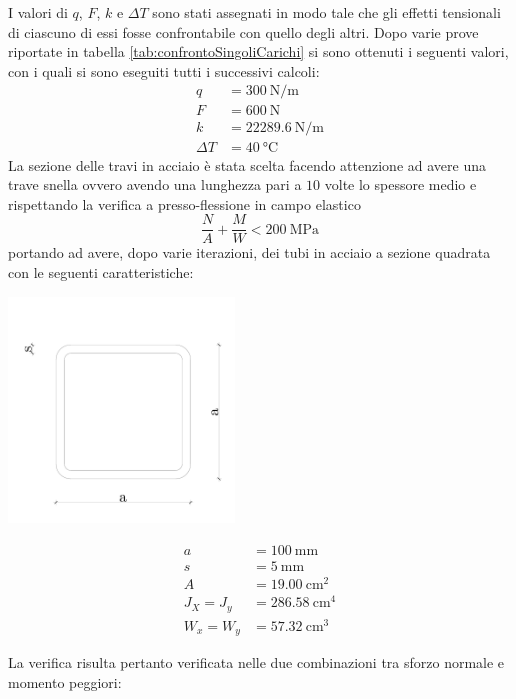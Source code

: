I valori di $q$, $F$, $k$ e $\Delta T$ sono stati assegnati in modo tale che gli effetti  tensionali di ciascuno di essi fosse confrontabile con quello degli altri. 
Dopo varie prove riportate in tabella \ref{tab:confrontoSingoliCarichi} si sono ottenuti i seguenti valori, con i quali si sono eseguiti tutti i successivi calcoli:
\begin{align*}
	q &= \SI{300}{\newton \per \metre}\\
	F &= \SI{600}{\newton}\\
	k &= \SI{22289.6}{\newton \per \metre}\\
	\Delta T &= \SI{40}{\celsius}
\end{align*}
La sezione delle travi in acciaio è stata scelta facendo attenzione ad avere una trave snella ovvero avendo una lunghezza pari a $10$ volte lo spessore medio e rispettando la verifica a presso-flessione in campo elastico 
\[
\frac{N}{A} + \frac{M}{W} < \SI{200}{\mega\pascal}
\]
portando ad avere, dopo varie iterazioni, dei tubi in acciaio a sezione quadrata con le seguenti caratteristiche:
\begin{center}
\begin{minipage}{6cm}
	\includegraphics[width=60mm]{rel1/img1/tubi-quadri.pdf}
\end{minipage}
\begin{minipage}{6cm}
	\begin{align*}
		a &= \SI{100}{\milli\metre}\\
		s &= \SI{5}{\milli\metre}\\
		A &= \SI{19.00}{\centi\metre\squared}\\
		J_X = J_y &= \SI{286.58}{\centi\metre\tothe{4}}\\
		W_x = W_y &= \SI{57.32}{\centi\metre\cubed}
	\end{align*}
\end{minipage}
\end{center}
La verifica risulta pertanto verificata nelle due combinazioni tra sforzo normale e momento peggiori: 
